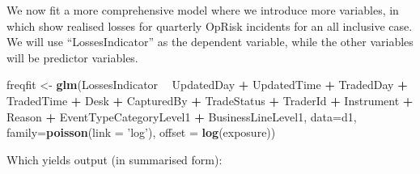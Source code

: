 \documentclass[]{article}
\newenvironment{Shaded}{\begin{snugshade}}{\end{snugshade}}
\newcommand{\KeywordTok}[1]{\textcolor[rgb]{0.13,0.29,0.53}{\textbf{#1}}}
\newcommand{\DataTypeTok}[1]{\textcolor[rgb]{0.13,0.29,0.53}{#1}}
\newcommand{\StringTok}[1]{\textcolor[rgb]{0.31,0.60,0.02}{#1}}
\newcommand{\OperatorTok}[1]{\textcolor[rgb]{0.81,0.36,0.00}{\textbf{#1}}}
\newcommand{\NormalTok}[1]{#1}
\begin{document}
\doublespacing

We now fit a more comprehensive model where we introduce more variables,
in which show realised losses for quarterly OpRisk incidents for an all
inclusive case. We will use ``LossesIndicator'' as the dependent
variable, while the other variables will be predictor variables.

\singlespacing

\begin{Shaded}
\begin{Highlighting}[]
\NormalTok{freqfit <-}\StringTok{ }\KeywordTok{glm}\NormalTok{(LossesIndicator }\OperatorTok{~}\StringTok{ }\NormalTok{UpdatedDay }\OperatorTok{+}\StringTok{ }\NormalTok{UpdatedTime }\OperatorTok{+}
\StringTok{                 }\NormalTok{TradedDay }\OperatorTok{+}\StringTok{ }\NormalTok{TradedTime }\OperatorTok{+}\StringTok{ }\NormalTok{Desk }\OperatorTok{+}\StringTok{ }\NormalTok{CapturedBy }\OperatorTok{+}
\StringTok{                 }\NormalTok{TradeStatus }\OperatorTok{+}\StringTok{ }\NormalTok{TraderId }\OperatorTok{+}\StringTok{ }\NormalTok{Instrument }\OperatorTok{+}\StringTok{ }\NormalTok{Reason}
               \OperatorTok{+}\StringTok{ }\NormalTok{EventTypeCategoryLevel1 }\OperatorTok{+}\StringTok{ }\NormalTok{BusinessLineLevel1,}
\DataTypeTok{data=}\NormalTok{d1, }\DataTypeTok{family=}\KeywordTok{poisson}\NormalTok{(}\DataTypeTok{link =} \StringTok{'log'}\NormalTok{), }\DataTypeTok{offset =} \KeywordTok{log}\NormalTok{(exposure))}
\end{Highlighting}
\end{Shaded}

\doublespacing

Which yields output (in summarised form):

\singlespacing
\end{document}

